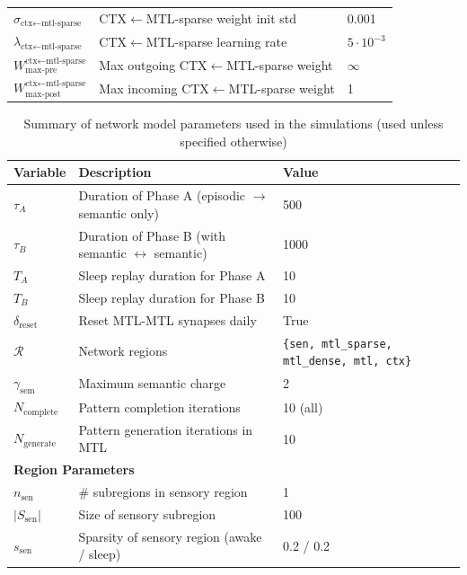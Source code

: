 \documentclass{article}
\begin{document}
\begin{table}[ht]
\begin{tabular}{lp{6cm}l}
$\sigma_{\text{ctx}\leftarrow\text{mtl-sparse}}$ & CTX$\leftarrow$MTL-sparse weight init std & 0.001 \\
$\lambda_{\text{ctx}\leftarrow\text{mtl-sparse}}$ & CTX$\leftarrow$MTL-sparse learning rate & $5\cdot 10^{-3}$ \\
$W^{\text{ctx}\leftarrow\text{mtl-sparse}}_{\text{max-pre}}$ & Max outgoing CTX$\leftarrow$MTL-sparse weight & $\infty$ \\
$W^{\text{ctx}\leftarrow\text{mtl-sparse}}_{\text{max-post}}$ & Max incoming CTX$\leftarrow$MTL-sparse weight & 1 \\
\bottomrule
\end{tabular}
\end{table}
\begin{table}[ht]
\centering
\caption{Summary of network model parameters used in the simulations (used unless specified otherwise)}
\label{tab:network_parameters}
\begin{tabular}{lll}
\toprule
\textbf{Variable} & \textbf{Description} & \textbf{Value} \\
\midrule

$\tau_A$ & Duration of Phase A (episodic $\to$ semantic only) & 500 \\
$\tau_B$ & Duration of Phase B (with semantic $\leftrightarrow$ semantic) & 1000 \\
$T_A$ & Sleep replay duration for Phase A & 10 \\
$T_B$ & Sleep replay duration for Phase B & 10 \\
$\delta_{\mathrm{reset}}$ & Reset MTL-MTL synapses daily & True \\
$\mathcal{R}$ & Network regions & \texttt{\{sen, mtl\_sparse, mtl\_dense, mtl, ctx\}} \\
$\gamma_{\text{sem}}$ & Maximum semantic charge & 2 \\
$N_{\text{complete}}$ & Pattern completion iterations & 10 (all) \\
$N_{\text{generate}}$ & Pattern generation iterations in MTL & 10 \\

\midrule
\multicolumn{3}{l}{\textbf{Region Parameters}} \\
\midrule

$n_{\text{sen}}$ & \# subregions in sensory region & 1 \\
$|S_{\text{sen}}|$ & Size of sensory subregion & 100 \\
$s_{\text{sen}}$ & Sparsity of sensory region (awake / sleep) & 0.2 / 0.2 \\


\end{tabular}
\end{table}
\end{document}
